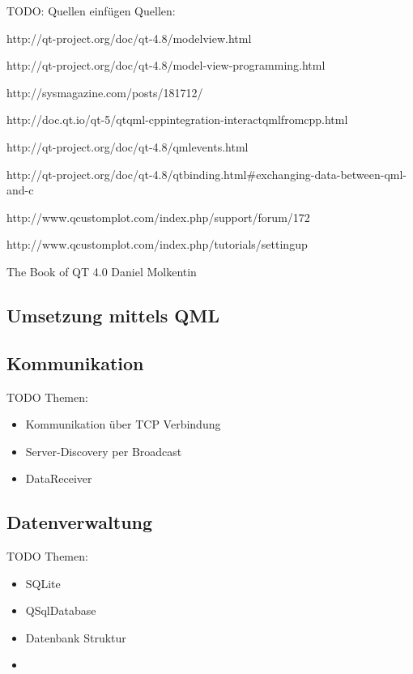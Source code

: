 TODO: Quellen einfügen
Quellen:

http://qt-project.org/doc/qt-4.8/modelview.html

http://qt-project.org/doc/qt-4.8/model-view-programming.html

http://sysmagazine.com/posts/181712/

http://doc.qt.io/qt-5/qtqml-cppintegration-interactqmlfromcpp.html

http://qt-project.org/doc/qt-4.8/qmlevents.html

http://qt-project.org/doc/qt-4.8/qtbinding.html\#exchanging-data-between-qml-and-c

http://www.qcustomplot.com/index.php/support/forum/172

http://www.qcustomplot.com/index.php/tutorials/settingup

The Book of QT 4.0 Daniel Molkentin


\subsection{Umsetzung mittels QML}

\subsection{Kommunikation}
TODO Themen:
\begin{itemize}
\item Kommunikation über TCP Verbindung \cite{qtcpserver}
\item Server-Discovery per Broadcast \cite{qudpsocket}
\item DataReceiver
\end{itemize}

\subsection{Datenverwaltung}
TODO Themen:
\begin{itemize}
\item SQLite
\item QSqlDatabase \cite{qsqldatabase}
\item Datenbank Struktur
\item 
\end{itemize}